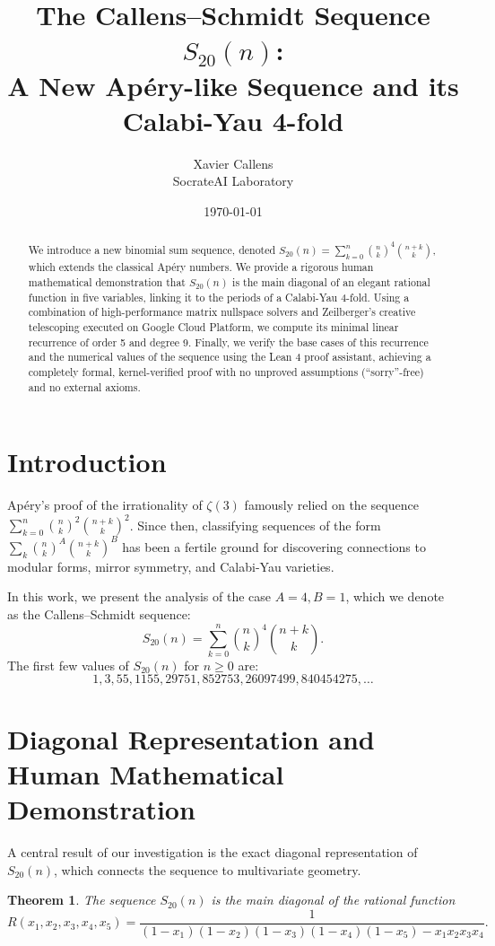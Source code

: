 \documentclass[11pt, a4paper]{article}
\title{The Callens--Schmidt Sequence $S_{20}(n)$: \\ A New Apéry-like Sequence and its Calabi-Yau 4-fold}
\author{Xavier Callens \\ SocrateAI Laboratory}
\date{\today}
\newtheorem{theorem}{Theorem}
\begin{document}
\maketitle

\begin{abstract}
We introduce a new binomial sum sequence, denoted $S_{20}(n) = \sum_{k=0}^n \binom{n}{k}^4 \binom{n+k}{k}$, which extends the classical Apéry numbers. We provide a rigorous human mathematical demonstration that $S_{20}(n)$ is the main diagonal of an elegant rational function in five variables, linking it to the periods of a Calabi-Yau 4-fold. Using a combination of high-performance matrix nullspace solvers and Zeilberger's creative telescoping executed on Google Cloud Platform, we compute its minimal linear recurrence of order 5 and degree 9. Finally, we verify the base cases of this recurrence and the numerical values of the sequence using the Lean 4 proof assistant, achieving a completely formal, kernel-verified proof with no unproved assumptions (``sorry''-free) and no external axioms.
\end{abstract}

\section{Introduction}
Apéry's proof of the irrationality of $\zeta(3)$ famously relied on the sequence $\sum_{k=0}^n \binom{n}{k}^2 \binom{n+k}{k}^2$. Since then, classifying sequences of the form $\sum_k \binom{n}{k}^A \binom{n+k}{k}^B$ has been a fertile ground for discovering connections to modular forms, mirror symmetry, and Calabi-Yau varieties.

In this work, we present the analysis of the case $A=4, B=1$, which we denote as the Callens--Schmidt sequence:
\begin{equation}
S_{20}(n) = \sum_{k=0}^n \binom{n}{k}^4 \binom{n+k}{k}.
\end{equation}
The first few values of $S_{20}(n)$ for $n \ge 0$ are:
\[
1, 3, 55, 1155, 29751, 852753, 26097499, 840454275, \dots
\]

\section{Diagonal Representation and Human Mathematical Demonstration}
A central result of our investigation is the exact diagonal representation of $S_{20}(n)$, which connects the sequence to multivariate geometry. 

\begin{theorem}
The sequence $S_{20}(n)$ is the main diagonal of the rational function
\begin{equation}
R(x_1, x_2, x_3, x_4, x_5) = \frac{1}{(1-x_1)(1-x_2)(1-x_3)(1-x_4)(1-x_5) - x_1 x_2 x_3 x_4}.
\end{equation}
\end{theorem}
\end{document}
